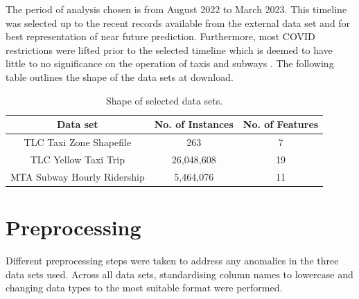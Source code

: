 \documentclass[11pt]{article}
\begin{document}
The period of analysis chosen is from August 2022 to March 2023. This timeline was selected up to the recent records available from the external data set and for best representation of near future prediction. Furthermore, most COVID restrictions were lifted prior to the selected timeline which is deemed to have little to no significance on the operation of taxis and subways \cite{2021CovidRest}. The following table outlines the shape of the data sets at download.

\begin{center}
\begin{table}[h]
    \centering
    \begin{tabular}{||c|c|c||}
        \hline \textbf{Data set} & \textbf{No. of Instances} & \textbf{No. of Features}\\
        \hline
         TLC Taxi Zone Shapefile & 263 & 7\\
         TLC Yellow Taxi Trip &  26,048,608 & 19 \\
         MTA Subway Hourly Ridership & 5,464,076 & 11 \\
        \hline
    \end{tabular}
    \caption{Shape of selected data sets.}
    \label{table:1}
\end{table}
    
\end{center}

\section{Preprocessing}
Different preprocessing steps were taken to address any anomalies in the three data sets used. Across all data sets, standardising column names to lowercase and changing data types to the most suitable format were performed. 
\end{document}

